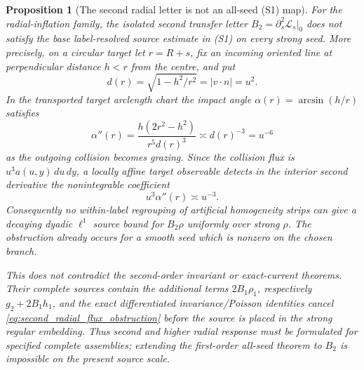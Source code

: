 \documentclass[11pt]{amsart}
\theoremstyle{compactplain}
\newtheorem{proposition}[theorem]{Proposition}
\theoremstyle{compactdefinition}
\theoremstyle{compactremark}
\newcommand{\Ltransfer}{\mathscr L}
\begin{document}
\begin{proposition}[The second radial letter is not an all-seed (S1) map]
\label{prop:second_radial_all_seed_s1_obstruction}
For the radial-inflation family, the isolated second transfer letter
\(B_2=\partial_s^2\Ltransfer_s|_0\) does not satisfy the base
label-resolved source estimate in (S1) on every strong seed.  More precisely,
on a circular target let \(r=R+s\), fix an incoming oriented line at
perpendicular distance \(h<r\) from the centre, and put
\[
 d(r)=\sqrt{1-h^2/r^2}=|v\cdot n|=u^2.
\]
In the transported target arclength chart the impact angle
\(\alpha(r)=\arcsin(h/r)\) satisfies
\begin{equation}
\label{eq:second_radial_impact_angle_singularity}
 \alpha''(r)
 =\frac{h(2r^2-h^2)}{r^5d(r)^3}
 \asymp d(r)^{-3}=u^{-6}
\end{equation}
as the outgoing collision becomes grazing.  Since the collision flux is
\(u^3a(u,y)\,du\,dy\), a locally affine target observable detects in the
interior second derivative the nonintegrable coefficient
\begin{equation}
\label{eq:second_radial_flux_obstruction}
 u^3\alpha''(r)\asymp u^{-3}.
\end{equation}
Consequently no within-label regrouping of artificial homogeneity strips can
give a decaying dyadic \(\ell^1\) source bound for \(B_2\rho\) uniformly over
strong \(\rho\).  The obstruction already occurs for a smooth seed which is
nonzero on the chosen branch.

This does not contradict the second-order invariant or exact-current
theorems.  Their complete sources contain the additional terms
\(2B_1\rho_1\), respectively
\(g_2+2B_1h_1\), and the exact differentiated invariance/Poisson identities
cancel \eqref{eq:second_radial_flux_obstruction} before the source is placed
in the strong regular embedding.  Thus second and higher radial response must
be formulated for specified complete assemblies; extending the first-order
all-seed theorem to \(B_2\) is impossible on the present source scale.
\end{proposition}
\end{document}
